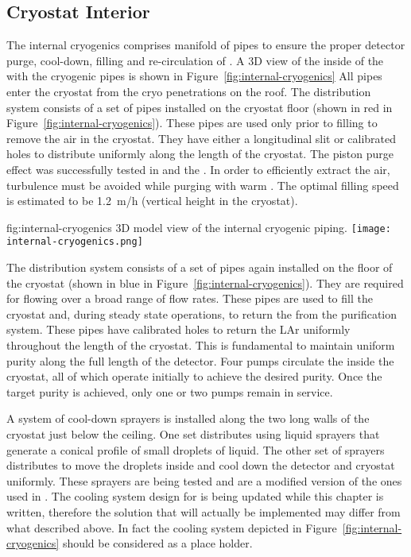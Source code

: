 \subsection{Cryostat Interior}
The internal cryogenics comprises manifold of pipes to ensure the proper detector purge, cool-down, filling and re-circulation of .
A 3D view of the inside of the  with the cryogenic pipes is shown in Figure~\ref{fig:internal-cryogenics}
All pipes enter the cryostat from the cryo penetrations on the roof.
The  distribution system consists of a set of pipes installed on the cryostat floor (shown in red in Figure~\ref{fig:internal-cryogenics}).
These pipes are used only prior to filling to remove the air in the cryostat.
They have either a longitudinal slit or calibrated holes to distribute  uniformly along the length of the cryostat.
The piston purge effect was successfully tested in  and the .
In order to efficiently extract the air, turbulence must be avoided while purging with warm .
The optimal filling speed is estimated to be 1.2~m/h (vertical height in the cryostat).
\begin{dunefigure}{fig:internal-cryogenics}
{3D model view of the internal cryogenic piping.}
\texttt{[image: internal-cryogenics.png]}
\end{dunefigure}

The  distribution system consists of a set of pipes again installed on the floor of the cryostat (shown in blue in Figure~\ref{fig:internal-cryogenics}).
They are required for flowing  over a broad range of flow rates.
These pipes are used to fill the cryostat and, during steady state operations, to return the  from the purification system.
These pipes have calibrated holes to return the LAr uniformly throughout the length of the cryostat.
This is fundamental to maintain uniform purity along the full length of the detector.
Four pumps circulate the  inside the cryostat, all of which operate initially to achieve the desired purity.
Once the target purity is achieved, only one or two pumps remain in service.

A system of cool-down sprayers is installed along the two long walls of the cryostat just below the ceiling.
One set distributes  using liquid sprayers that generate a conical profile of small droplets of liquid.
The other set of sprayers distributes  to move the  droplets inside and cool down the detector and cryostat uniformly.
These sprayers are being tested  and are a modified version of the ones used in .
The cooling system design for  is being updated while this chapter is written, therefore the solution that will actually be implemented may differ from what described above.
In fact the cooling system depicted in Figure~\ref{fig:internal-cryogenics} should be considered as a place holder.

